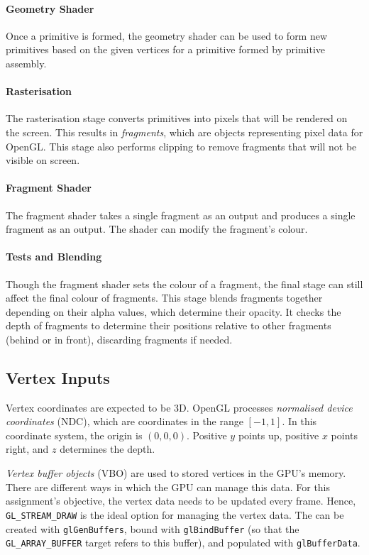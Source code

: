 \documentclass[a4paper, 12pt]{scrartcl}
\begin{document}
\paragraph{Geometry Shader}
Once a primitive is formed, the geometry shader can be used to form new primitives based on the given vertices for a primitive formed by primitive assembly.

\paragraph{Rasterisation}
The rasterisation stage converts primitives into pixels that will be rendered on the screen. This results in \textit{fragments}, which are objects representing pixel data for OpenGL. This stage also performs clipping to remove fragments that will not be visible on screen.

\paragraph{Fragment Shader}
The fragment shader takes a single fragment as an output and produces a single fragment as an output. The shader can modify the fragment's colour.

\paragraph{Tests and Blending}
Though the fragment shader sets the colour of a fragment, the final stage can still affect the final colour of fragments. This stage blends fragments together depending on their alpha values, which determine their opacity. It checks the depth of fragments to determine their positions relative to other fragments (behind or in front), discarding fragments if needed.

\subsection{Vertex Inputs}
Vertex coordinates are expected to be 3D. OpenGL processes \textit{normalised device coordinates} (NDC), which are coordinates in the range $[-1,1]$. In this coordinate system, the origin is $(0,0,0)$. Positive $y$ points up, positive $x$ points right, and $z$ determines the depth.

\textit{Vertex buffer objects} (VBO) are used to stored vertices in the GPU's memory. There are different ways in which the GPU can manage this data. For this assignment's objective, the vertex data needs to be updated every frame. Hence, \texttt{GL\_STREAM\_DRAW} is the ideal option for managing the vertex data. The can be created with \texttt{glGenBuffers}, bound with \texttt{glBindBuffer} (so that the \texttt{GL\_ARRAY\_BUFFER} target refers to this buffer), and populated with \texttt{glBufferData}.
\end{document}
